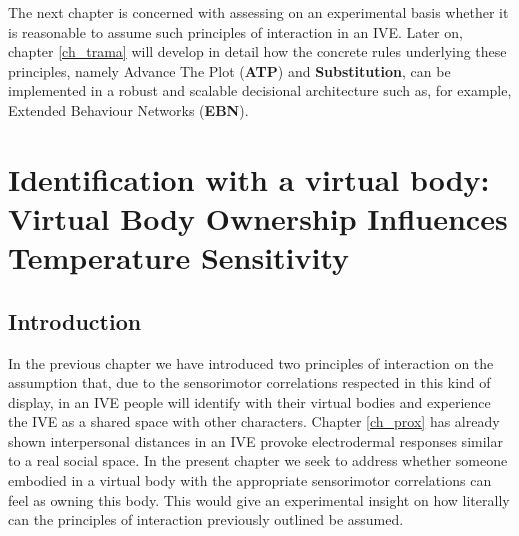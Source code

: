 \documentclass[
		twoside,openright,titlepage,numbers=noenddot,manychapters,
		headinclude,%
                footinclude=false,cleardoublepage=empty,
                BCOR=5mm,
		fontsize=11pt, %
                 enabledeprecatedfontcommands]{scrreprt}
\begin{document}
The next chapter is concerned with assessing on an experimental basis whether it is reasonable to assume such principles of interaction in an IVE. Later on, chapter \ref{ch_trama} will develop in detail how the concrete rules underlying these principles, namely Advance The Plot (\textbf{ATP}) and \textbf{Substitution}, can be implemented in a robust and scalable decisional architecture such as, for example, Extended Behaviour Networks (\textbf{EBN}). 

\cleardoublepage

\chapter[Identification with a virtual body]{Identification with a virtual body: Virtual Body Ownership Influences Temperature Sensitivity}


\thispagestyle{empty}
\label{ch_ident}

\section{Introduction}
In the previous chapter we have introduced two principles of interaction on the assumption that, due to the sensorimotor correlations respected in this kind of display, in an IVE people will identify with their virtual bodies and experience the IVE as a shared space with other characters. Chapter \ref{ch_prox} has already shown interpersonal distances in an IVE provoke electrodermal responses similar to a real social space. In the present chapter we seek to address whether  someone embodied in a virtual body with the appropriate sensorimotor correlations can feel as owning this body. This would give an experimental insight on how literally can the principles of interaction previously outlined be assumed.
\\ \
\end{document}
